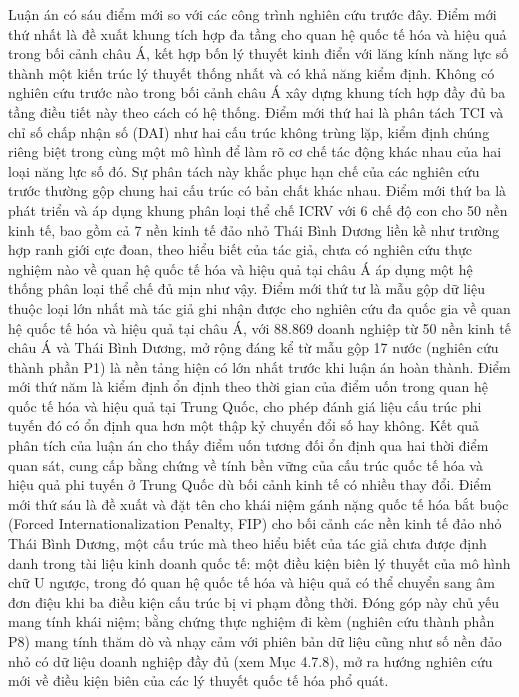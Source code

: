 \documentclass[
  a4paper,
  13pt]{extreport}
\begin{document}
Luận án có sáu điểm mới so với các công trình nghiên cứu trước đây. Điểm
mới thứ nhất là đề xuất khung tích hợp đa tầng cho quan hệ quốc tế hóa
và hiệu quả trong bối cảnh châu Á, kết hợp bốn lý thuyết kinh điển với
lăng kính năng lực số thành một kiến trúc lý thuyết thống nhất và có khả
năng kiểm định. Không có nghiên cứu trước nào trong bối cảnh châu Á xây
dựng khung tích hợp đầy đủ ba tầng điều tiết này theo cách có hệ thống.
Điểm mới thứ hai là phân tách TCI và chỉ số chấp nhận số (DAI) như hai
cấu trúc không trùng lặp, kiểm định chúng riêng biệt trong cùng một mô
hình để làm rõ cơ chế tác động khác nhau của hai loại năng lực số đó. Sự
phân tách này khắc phục hạn chế của các nghiên cứu trước thường gộp
chung hai cấu trúc có bản chất khác nhau. Điểm mới thứ ba là phát triển
và áp dụng khung phân loại thể chế ICRV với 6 chế độ con cho 50 nền kinh
tế, bao gồm cả 7 nền kinh tế đảo nhỏ Thái Bình Dương liền kề như trường
hợp ranh giới cực đoan, theo hiểu biết của tác giả, chưa có nghiên cứu
thực nghiệm nào về quan hệ quốc tế hóa và hiệu quả tại châu Á áp dụng
một hệ thống phân loại thể chế đủ mịn như vậy. Điểm mới thứ tư là mẫu
gộp dữ liệu thuộc loại lớn nhất mà tác giả ghi nhận được cho nghiên cứu
đa quốc gia về quan hệ quốc tế hóa và hiệu quả tại châu Á, với 88.869
doanh nghiệp từ 50 nền kinh tế châu Á và Thái Bình Dương, mở rộng đáng
kể từ mẫu gộp 17 nước (nghiên cứu thành phần P1) là nền tảng hiện có lớn
nhất trước khi luận án hoàn thành. Điểm mới thứ năm là kiểm định ổn định
theo thời gian của điểm uốn trong quan hệ quốc tế hóa và hiệu quả tại
Trung Quốc, cho phép đánh giá liệu cấu trúc phi tuyến đó có ổn định qua
hơn một thập kỷ chuyển đổi số hay không. Kết quả phân tích của luận án
cho thấy điểm uốn tương đối ổn định qua hai thời điểm quan sát, cung cấp
bằng chứng về tính bền vững của cấu trúc quốc tế hóa và hiệu quả phi
tuyến ở Trung Quốc dù bối cảnh kinh tế có nhiều thay đổi. Điểm mới thứ
sáu là đề xuất và đặt tên cho khái niệm gánh nặng quốc tế hóa bắt buộc
(Forced Internationalization Penalty, FIP) cho bối cảnh các nền kinh tế
đảo nhỏ Thái Bình Dương, một cấu trúc mà theo hiểu biết của tác giả chưa
được định danh trong tài liệu kinh doanh quốc tế: một điều kiện biên lý
thuyết của mô hình chữ U ngược, trong đó quan hệ quốc tế hóa và hiệu quả
có thể chuyển sang âm đơn điệu khi ba điều kiện cấu trúc bị vi phạm đồng
thời. Đóng góp này chủ yếu mang tính khái niệm; bằng chứng thực nghiệm
đi kèm (nghiên cứu thành phần P8) mang tính thăm dò và nhạy cảm với
phiên bản dữ liệu cũng như số nền đảo nhỏ có dữ liệu doanh nghiệp đầy đủ
(xem Mục 4.7.8), mở ra hướng nghiên cứu mới về điều kiện biên của các lý
thuyết quốc tế hóa phổ quát.
\end{document}
